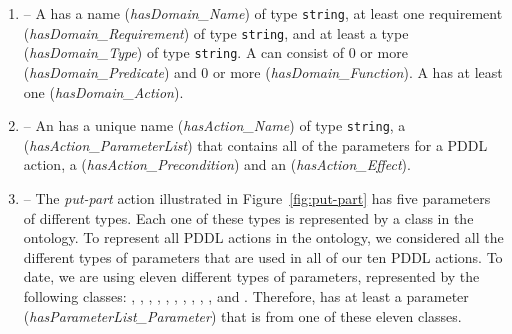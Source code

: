 %
%
\begin{enumerate}
\item {} -- A  has a name (\emph{hasDomain\_Name}) of type 
\texttt{string}, at least one requirement (\emph{hasDomain\_Requirement}) of type 
\texttt{string}, and at least a type (\emph{hasDomain\_Type}) of type \texttt{string}. 
A  can consist of 0 or more  (\emph{hasDomain\_Predicate}) 
and 0 or more  (\emph{hasDomain\_Function}). A  has 
at least one  (\emph{hasDomain\_Action}).
\item {} -- An  has a unique name (\emph{hasAction\_Name}) of 
type \texttt{string}, a  (\emph{hasAction\_ParameterList}) that contains all of the 
parameters for a PDDL action,
a  (\emph{hasAction\_Precondition}) and 
an  (\emph{hasAction\_Effect}). 
\item {} -- The \textsl{put-part} action illustrated in 
Figure~\ref{fig:put-part} has five parameters of different types. Each one of 
these types is represented by a class in the  ontology. To represent 
all PDDL actions in the  ontology, we considered all the different types 
of parameters that are used in all of our ten PDDL actions. To date, we are using eleven 
different types of parameters, represented by the following classes: 
, , , , 
, , , 
, , , and . 
Therefore,  has at least a parameter 
(\emph{hasParameterList\_Parameter}) that is from one of these eleven classes.


\end{enumerate}
